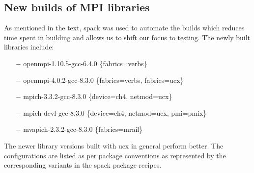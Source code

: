 \documentclass[manuscript,screen]{acmart}
\begin{document}
\subsection{New builds of MPI libraries}
As mentioned in the text, spack\cite{spack} was used to automate the builds which reduces time spent in building and allows us to shift our focus to testing. The newly built libraries include:
\begin{itemize}
	\item[$-$] openmpi-1.10.5-gcc-6.4.0 \{fabrics=verbs\}
	\item[$-$] openmpi-4.0.2-gcc-8.3.0 \{fabrics=verbs, fabrics=ucx\}
	\item[$-$] mpich-3.3.2-gcc-8.3.0 \{device=ch4, netmod=ucx\}
	\item[$-$] mpich-devl-gcc-8.3.0 \{device=ch4, netmod=ucx, pmi=pmix\}
	\item[$-$] mvapich-2.3.2-gcc-8.3.0 \{fabrics=mrail\}
\end{itemize} 
The newer library versions built with ucx in general perform better. The configurations are listed as per package conventions as represented by the corresponding variants in the spack package recipes.
\end{document}
